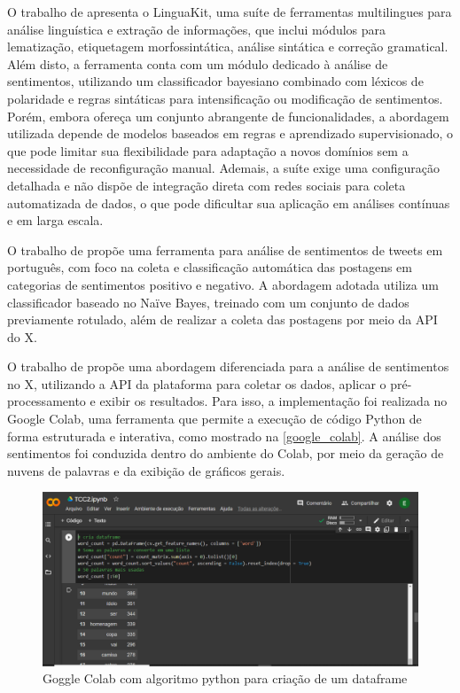 \documentclass[
	12pt,				%
	oneside,			%
	a4paper,			%
	english,			%
	french,				%
	spanish,			%
	brazil				%
	]{abntex2}
\begin{document}
O trabalho de  apresenta o LinguaKit,
uma suíte de ferramentas multilingues para análise linguística e
extração de informações, que inclui módulos para lematização,
etiquetagem morfossintática, análise sintática e correção gramatical.
Além disto, a ferramenta conta com um módulo dedicado à análise de
sentimentos, utilizando um classificador bayesiano combinado com léxicos
de polaridade e regras sintáticas para intensificação ou modificação de
sentimentos. Porém, embora ofereça um conjunto abrangente de
funcionalidades, a abordagem utilizada depende de modelos baseados em
regras e aprendizado supervisionado, o que pode limitar sua
flexibilidade para adaptação a novos domínios sem a necessidade de
reconfiguração manual. Ademais, a suíte exige uma configuração detalhada
e não dispõe de integração direta com redes sociais para coleta
automatizada de dados, o que pode dificultar sua aplicação em análises
contínuas e em larga escala.

O trabalho de  propõe uma ferramenta para
análise de sentimentos de tweets em português, com foco na coleta e
classificação automática das postagens em categorias de sentimentos
positivo e negativo. A abordagem adotada utiliza um classificador
baseado no Naïve Bayes, treinado com um conjunto de dados previamente
rotulado, além de realizar a coleta das postagens por meio da API do X.

O trabalho de  propõe uma abordagem diferenciada
para a análise de sentimentos no X, utilizando a API da plataforma para
coletar os dados, aplicar o pré-processamento e exibir os resultados.
Para isso, a implementação foi realizada no Google Colab, uma ferramenta
que permite a execução de código Python de forma estruturada e
interativa, como mostrado na \autoref{google_colab}. A análise dos
sentimentos foi conduzida dentro do ambiente do Colab, por meio da
geração de nuvens de palavras e da exibição de gráficos gerais.

\begin{figure}[htbp]
\hypertarget{google_colab}{%
\caption{Goggle Colab com algoritmo python para criação de um dataframe}\label{google_colab}
\begin{center}
\includegraphics[scale=0.3]{imagens/google_colab.png}
\end{center}
}
\end{figure}
\end{document}
